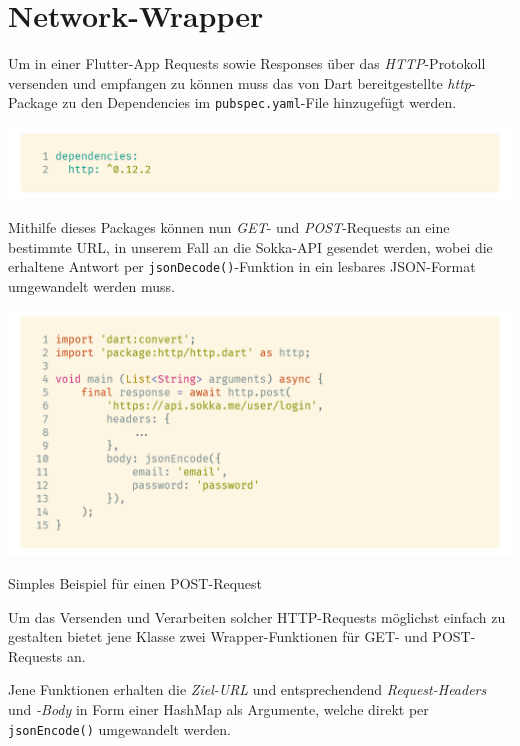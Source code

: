 \section{Network-Wrapper}

Um in einer Flutter-App Requests sowie Responses über das \textit{HTTP}-Protokoll versenden und empfangen zu können
muss das von Dart bereitgestellte \textit{http}-Package zu den Dependencies im \lstinline{pubspec.yaml}-File hinzugefügt
werden.

\begin{code}
    \centering
    \includegraphics[width=1\textwidth]{images/Client/util/network-wrapper/dependency.png}
    \caption{Hinzufügen des \textbf{http}-Packages zum \lstinline{pubspec.yaml}-File}
\end{code}

Mithilfe dieses Packages können nun \textit{GET}- und \textit{POST}-Requests an eine bestimmte URL, in unserem Fall
an die Sokka-API gesendet werden, wobei die erhaltene Antwort per \lstinline{jsonDecode()}-Funktion in ein lesbares
JSON-Format umgewandelt werden muss.

\begin{code}
    \centering
    \includegraphics[width=1\textwidth]{images/Client/util/network-wrapper/postRequest.png}
    \caption{Simples Beispiel für einen POST-Request}
\end{code}

\newpage

Um das Versenden und Verarbeiten solcher HTTP-Requests möglichst einfach zu gestalten bietet jene
Klasse zwei Wrapper-Funktionen für GET- und POST-Requests an.

Jene Funktionen erhalten die \textit{Ziel-URL} und entsprechendend \textit{Request-Headers} und \textit{-Body} in Form einer HashMap
als Argumente, welche direkt per \lstinline{jsonEncode()} umgewandelt werden.

